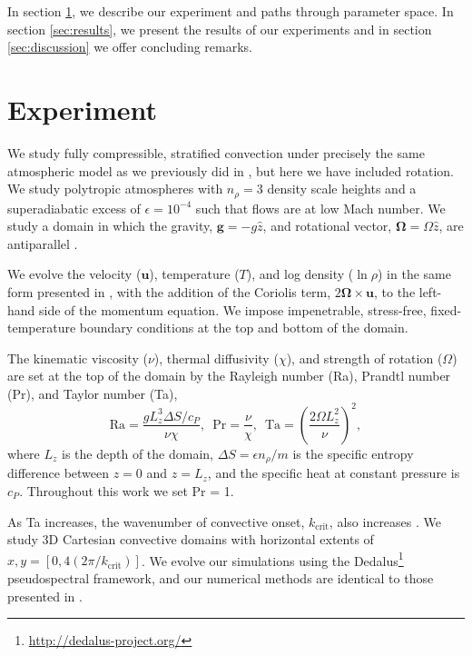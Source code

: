\documentclass[twocolumn, amsmath, amsfonts, amssymb]{aastex62}
\begin{document}
In section  \ref{sec:experiment}, we describe our experiment and paths through parameter space. 
In section \ref{sec:results}, we present
the results of our experiments and in section \ref{sec:discussion} we offer concluding remarks.

\section{Experiment} 
\label{sec:experiment}
We study fully compressible, stratified 
convection under precisely the same atmospheric model
as we previously did in \AB, but here
we have included rotation. We study polytropic atmospheres
with $n_\rho = 3$ density scale heights and a superadiabatic
excess of $\epsilon = 10^{-4}$ such that flows are at low Mach number.
We study a domain in which the
gravity, $\bm{g} = -g\hat{z}$, and rotational vector, $\bm{\Omega} = \Omega \hat{z}$, 
are antiparallel \citep{julien&all1996, brummell&all1996}.

We evolve the velocity ($\bm{u}$), temperature ($T$), 
and log density ($\ln\rho$) in the same form presented in \AB, with the
addition of the Coriolis term, $2\bm{\Omega}\times\bm{u}$, to the left-hand side
of the momentum equation. We impose impenetrable, stress-free, fixed-temperature boundary
conditions at the top and bottom of the domain.


The kinematic viscosity ($\nu$), thermal diffusivity ($\chi$), and strength of
rotation ($\Omega$) are set at the top of the domain by the Rayleigh number
(Ra), Prandtl number (Pr), and Taylor number (Ta),
\begin{equation}
    \text{Ra} = \frac{g L_z^3 \Delta S / c_P}{\nu \chi}, \,\,\,
    \text{Pr} = \frac{\nu}{\chi}, \,\,\,
    \text{Ta} = \left(\frac{2 \Omega L_z^2}{\nu}\right)^2,
\end{equation}
where $L_z$ is the depth of the domain, 
$\Delta S = \epsilon n_\rho / m$ is the specific entropy difference between
$z = 0$ and $z = L_z$, and the specific heat at constant pressure is $c_P$.
Throughout this work we set Pr = 1.

As Ta increases, the wavenumber of convective onset, $k_{\text{crit}}$, also increases
\citep{calkins&all2015a}. 
We study 3D Cartesian convective domains with horizontal extents of
$x, y = [0, 4(2\pi/k_{\text{crit}})]$. 
We evolve our simulations using the Dedalus\footnote{\url{http://dedalus-project.org/}} 
pseudospectral framework, and our numerical methods are identical to those presented
in \AB.
\end{document}

